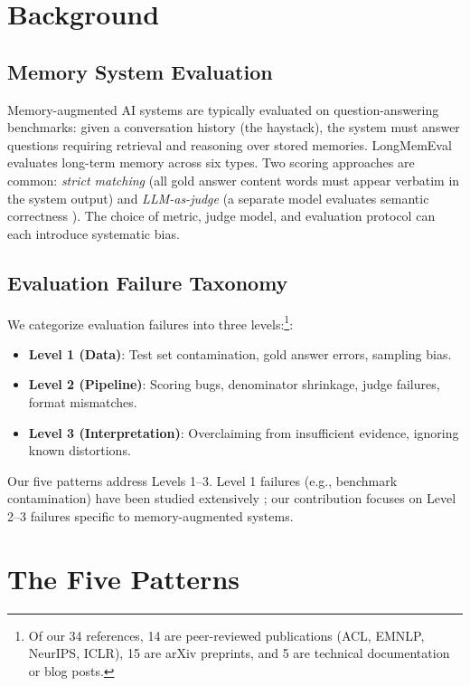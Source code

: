 \documentclass[11pt]{article}
\begin{document}
\section{Background}

\subsection{Memory System Evaluation}

Memory-augmented AI systems are typically evaluated on question-answering benchmarks: given a conversation history (the haystack), the system must answer questions requiring retrieval and reasoning over stored memories. LongMemEval \citep{wu2024longmemeval} evaluates long-term memory across six types. Two scoring approaches are common: \emph{strict matching} (all gold answer content words must appear verbatim in the system output) and \emph{LLM-as-judge} (a separate model evaluates semantic correctness \citep{zheng2023judge}). The choice of metric, judge model, and evaluation protocol can each introduce systematic bias.

\subsection{Evaluation Failure Taxonomy}

We categorize evaluation failures into three levels:\footnote{Of our 34 references, 14 are peer-reviewed publications (ACL, EMNLP, NeurIPS, ICLR), 15 are arXiv preprints, and 5 are technical documentation or blog posts.}:
\begin{itemize}
\item \textbf{Level 1 (Data)}: Test set contamination, gold answer errors, sampling bias.
\item \textbf{Level 2 (Pipeline)}: Scoring bugs, denominator shrinkage, judge failures, format mismatches.
\item \textbf{Level 3 (Interpretation)}: Overclaiming from insufficient evidence, ignoring known distortions.
\end{itemize}

Our five patterns address Levels 1--3. Level 1 failures (e.g., benchmark contamination) have been studied extensively \citep{benchmark_contamination_1,pitfalls_forecasting}; our contribution focuses on Level 2--3 failures specific to memory-augmented systems.

\section{The Five Patterns}
\label{sec:patterns}
\end{document}
